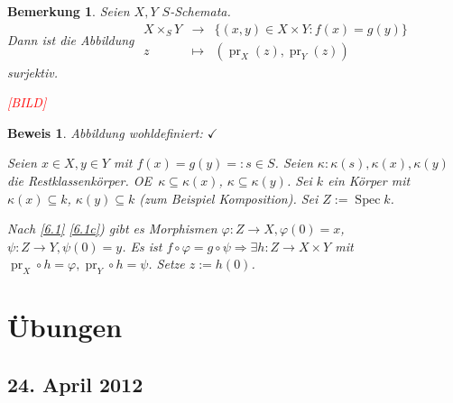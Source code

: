 \documentclass[paper = A4, fontsize=12pt, numbers=noendperiod, chapterprefix=true]{scrbook}
\renewcommand{\thesection}{\arabic{section}}
\renewcommand*{\othersectionlevelsformat}[3]{\ifstr{#1}{section}{\S\ #3\autodot}{#3\autodot}\enskip}
\renewcommand*{\sectionmarkformat}{\S \thesection\autodot\enskip}
\theoremstyle{break}
\newtheorem{Bem}[Def]{Bemerkung}
\theoremstyle{nonumberbreak}
\newtheorem{bew}{Beweis}
\theoremstyle{nonumberplain}
\DeclareMathOperator{\Spec}{Spec}
\DeclareMathOperator{\pr}{pr}
\newcommand{\X}{\times}
\renewcommand{\OE}{O\!\!E~}
\begin{document}
\begin{Bem}
Seien $X, Y$ $S$-Schemata.\\
Dann ist die Abbildung $\begin{array}{ccc} X \X_S Y &\to& \{(x,y) \in X \X Y: f(x)=g(y)\} \\ z &\mapsto& (\pr_X(z), \pr_Y(z))\end{array}$ surjektiv.
\begin{center}\textcolor{red}{[BILD]}\end{center}
\end{Bem}

\begin{bew}
Abbildung wohldefiniert: $\checkmark$

Seien $x\in X, y \in Y$ mit $f(x) = g(y) =: s \in S$. Seien $\kappa: \kappa(s), \kappa(x), \kappa(y)$ die Restklassenk\"orper. \OE $\kappa \subseteq \kappa(x)$, $\kappa \subseteq \kappa(y)$. Sei $k$ ein K\"orper mit $\kappa(x) \subseteq k$, $\kappa(y) \subseteq k$ (zum Beispiel Komposition). Sei $Z:= \Spec k$.

Nach \ref{6.1} \ref{6.1c}) gibt es Morphismen $\varphi: Z \to X, \varphi(0) = x$, $\psi: Z \to Y, \psi(0) = y$. Es ist $f \circ \varphi = g \circ \psi \Rightarrow  \exists h: Z \to X \X Y$ mit $\pr_X \circ h = \varphi, \pr_Y \circ h = \psi$. Setze $z := h(0)$.
\end{bew}


\appendix


\chapter{\"Ubungen}

\renewcommand*{\othersectionlevelsformat}[3]{\ifstr{#1}{section}{\"Ubung\ #3\ vom\ }{#3\autodot\enskip}}

\renewcommand*{\sectionmarkformat}{\"Ubung \thesection\autodot\ vom\enskip}

\setcounter{section}{-1}

\section{24. April 2012}
\setcounter{Aufg}{0} %
\setcounter{Loes}{0}
\end{document}
